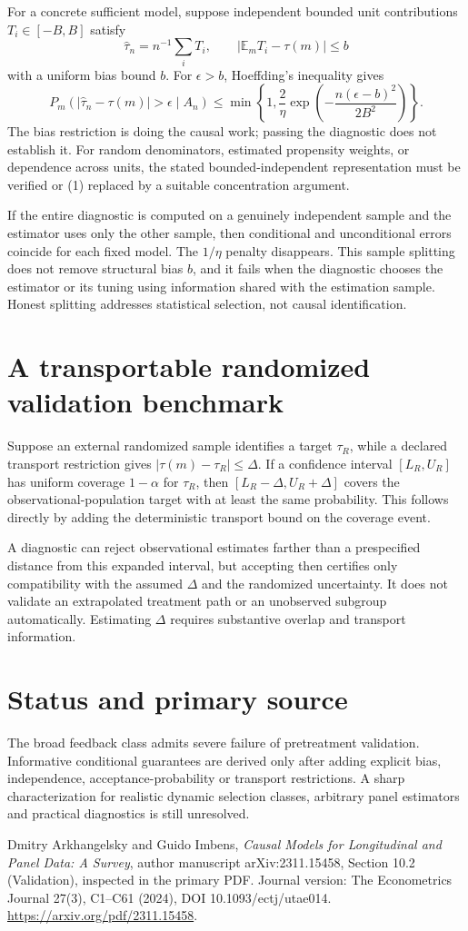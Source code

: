 \documentclass[11pt]{article}
\newcommand{\E}{\mathbb E}
\begin{document}
For a concrete sufficient model, suppose independent bounded unit contributions $T_i\in[-B,B]$ satisfy
\[
 \widehat\tau_n=n^{-1}\sum_iT_i,
 \qquad |\E_mT_i-\tau(m)|\leq b
\]
with a uniform bias bound $b$. For $\epsilon>b$, Hoeffding's inequality gives
\[
 P_m(|\widehat\tau_n-\tau(m)|>\epsilon\mid A_n)
 \leq\min\left\{1,\frac{2}{\eta}
 \exp\left(-\frac{n(\epsilon-b)^2}{2B^2}\right)\right\}. \tag{1}
\]
The bias restriction is doing the causal work; passing the diagnostic does not establish it. For random denominators, estimated propensity weights, or dependence across units, the stated bounded-independent representation must be verified or (1) replaced by a suitable concentration argument.

If the entire diagnostic is computed on a genuinely independent sample and the estimator uses only the other sample, then conditional and unconditional errors coincide for each fixed model. The $1/\eta$ penalty disappears. This sample splitting does not remove structural bias $b$, and it fails when the diagnostic chooses the estimator or its tuning using information shared with the estimation sample. Honest splitting addresses statistical selection, not causal identification.

\section*{A transportable randomized validation benchmark}
Suppose an external randomized sample identifies a target $\tau_R$, while a declared transport restriction gives $|\tau(m)-\tau_R|\leq\Delta$. If a confidence interval $[L_R,U_R]$ has uniform coverage $1-\alpha$ for $\tau_R$, then $[L_R-\Delta,U_R+\Delta]$ covers the observational-population target with at least the same probability. This follows directly by adding the deterministic transport bound on the coverage event.

A diagnostic can reject observational estimates farther than a prespecified distance from this expanded interval, but accepting then certifies only compatibility with the assumed $\Delta$ and the randomized uncertainty. It does not validate an extrapolated treatment path or an unobserved subgroup automatically. Estimating $\Delta$ requires substantive overlap and transport information.

\section*{Status and primary source}
The broad feedback class admits severe failure of pretreatment validation. Informative conditional guarantees are derived only after adding explicit bias, independence, acceptance-probability or transport restrictions. A sharp characterization for realistic dynamic selection classes, arbitrary panel estimators and practical diagnostics is still unresolved.

Dmitry Arkhangelsky and Guido Imbens, \emph{Causal Models for Longitudinal and Panel Data: A Survey}, author manuscript arXiv:2311.15458, Section 10.2 (Validation), inspected in the primary PDF. Journal version: The Econometrics Journal 27(3), C1--C61 (2024), DOI 10.1093/ectj/utae014. \url{https://arxiv.org/pdf/2311.15458}.
\end{document}
